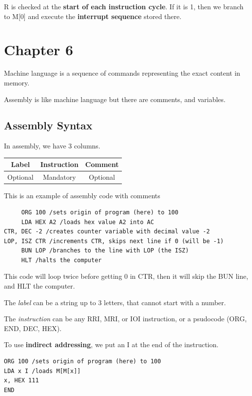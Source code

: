 \documentclass[12pt,letterpaper]{article} \usepackage{amsmath} \usepackage{graphicx} \usepackage[margin=1in]{geometry} \usepackage{longtable}  \usepackage{amssymb}
\begin{document}
			R is checked at the\textbf{ start of each instruction cycle}. If it is 1, then we branch to M[0] and execute the \textbf{interrupt sequence} stored there. 
		
		
		
		
		\section{Chapter 6}
		Machine language is a sequence of commands representing the exact content in memory. 
		
		Assembly is like machine language but there are comments, and variables. 
		
			\subsection{Assembly Syntax}
			In assembly, we have 3 columns.
			
			\begin{tabular}{|c|c|c|}
				\hline
				Label & Instruction & Comment \\
				\hline
				Optional & Mandatory & Optional \\
				\hline
			\end{tabular}
		
			\begin{mdframed}[]
				This is an example of assembly code with comments
			\begin{lstlisting}
     ORG 100 /sets origin of program (here) to 100
     LDA HEX A2 /loads hex value A2 into AC
CTR, DEC -2 /creates counter variable with decimal value -2
LOP, ISZ CTR /increments CTR, skips next line if 0 (will be -1)
     BUN LOP /branches to the line with LOP (the ISZ)
     HLT /halts the computer				
			\end{lstlisting}
				This code will loop twice before getting 0 in CTR, then it will skip the BUN line, and HLT the computer.
			\end{mdframed}
		
			The \textit{label }can be a string up to 3 letters, that cannot start with a number. 
			
			The \textit{instruction} can be any RRI, MRI, or IOI instruction, or a psudocode (ORG, END, DEC, HEX).
			
			To use \textbf{indirect addressing}, we put an I at the end of the instruction.
			\begin{mdframed}[]
				\begin{lstlisting}
ORG 100 /sets origin of program (here) to 100
LDA x I /loads M[M[x]]
x, HEX 111	
END				
				\end{lstlisting}
			\end{mdframed}
			
\end{document}

